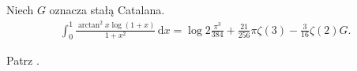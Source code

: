 %

\begin{problem_with_solution}
    \label{valean_1_21}%
    Niech $G$ oznacza stałą Catalana.
    \begin{align}
        \int_0^1 \frac{\arctan^2 x \log (1 + x)}{1 + x^2} \,\mathrm{d} x = \log 2 \frac {\pi^3}{384} + \frac {21}{256} \pi \zeta(3) - \frac{3}{16} \zeta (2) G.
    \end{align} 
\end{problem_with_solution}


\begin{solution}
    Patrz \cite[s. 12]{valean19}.
\end{solution}

%